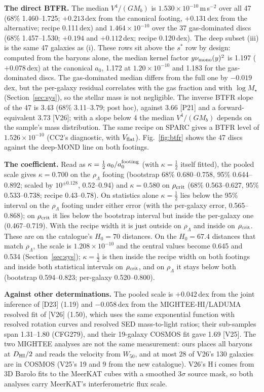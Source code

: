 \documentclass[10pt]{article}
\begin{document}
\textbf{The direct BTFR.} The median $V^4/(GM_b)$ is $1.530\times10^{-10}$\,m\,s$^{-2}$ over all 47 (68\% 1.460--1.725; $+0.213$\,dex from the canonical footing, $+0.131$\,dex from the alternative; recipe 0.111\,dex) and $1.464\times10^{-10}$ over the 37 gas-dominated discs (68\% 1.457--1.530; $+0.194$ and $+0.112$\,dex; recipe 0.120\,dex). The deep subset (iii) is the same 47 galaxies as (i). These rows sit above the $s^*$ row by design: computed from the baryons alone, the median kernel factor $y\nu_{\rm mono}(y)^2$ is 1.197 ($+0.078$\,dex) at the canonical $a_0$, 1.172 at $1.20\times10^{-10}$ and 1.183 for the gas-dominated discs. The gas-dominated median differs from the full one by $-0.019$\,dex, but the per-galaxy residual correlates with the gas fraction and with $\log M_\star$ (Section~\ref{sec:sys}), so the stellar mass is not negligible. The inverse BTFR slope of the 47 is 3.43 (68\% 3.11--3.79; post hoc), against 3.66 [P21] and a forward-equivalent 3.73 [V26]; with a slope below 4 the median $V^4/(GM_b)$ depends on the sample's mass distribution. The same recipe on SPARC gives a BTFR level of $1.526\times10^{-10}$ (CC2's diagnostic, with $V_{\rm flat}$). Fig.~\ref{fig:btfr} shows the 47 discs against the deep-MOND line on both footings.

\textbf{The coefficient.} Read as $\kappa=\tfrac12\,a_0/a_0^{\rm footing}$ (with $\kappa=\tfrac12$ itself fitted), the pooled scale gives $\kappa=0.700$ on the $\rho_\Lambda$ footing (bootstrap 68\% 0.680--0.758, 95\% 0.644--0.892; scaled by $10^{\pm0.128}$, 0.52--0.94) and $\kappa=0.580$ on $\rho_{\rm crit}$ (68\% 0.563--0.627, 95\% 0.533--0.738; recipe 0.43--0.78). On statistics alone $\kappa=\tfrac12$ lies below the 95\% interval on the $\rho_\Lambda$ footing under either error (with the per-galaxy error, 0.565--0.868); on $\rho_{\rm crit}$ it lies below the bootstrap interval but inside the per-galaxy one (0.467--0.719). With the recipe width it is just outside on $\rho_\Lambda$ and inside on $\rho_{\rm crit}$. These are on the catalogue's $H_0=70$ distances. On the $H_0=67.4$ distances that match $\rho_\Lambda$, the scale is $1.208\times10^{-10}$ and the central values become 0.645 and 0.534 (Section~\ref{sec:sys}); $\kappa=\tfrac12$ is then inside the recipe width on both footings and inside both statistical intervals on $\rho_{\rm crit}$, and on $\rho_\Lambda$ it stays below both (bootstrap 0.594--0.823; per-galaxy 0.520--0.800).

\textbf{Against other determinations.} The pooled scale is $+0.042$\,dex from the joint inference of [D23] (1.19) and $-0.058$\,dex from the MIGHTEE-HI/LADUMA resolved fit of [V26] (1.50), which uses the same exponential function with resolved rotation curves and resolved SED mass-to-light ratios; their sub-samples span 1.31--1.80 (CFG279), and their 19-galaxy COSMOS fit gave 1.69 [V25]. The two MIGHTEE analyses are not the same measurement: ours places all baryons at $D_{\rm HI}/2$ and reads the velocity from $W_{50}$, and at most 28 of V26's 130 galaxies are in COSMOS (V25's 19 and 9 from the new catalogue). V26's H\,{\sc i} comes from 3D Barolo fits to the MeerKAT cubes with a smoothed $3\sigma$ source mask, so both analyses carry MeerKAT's interferometric flux scale.
\end{document}
